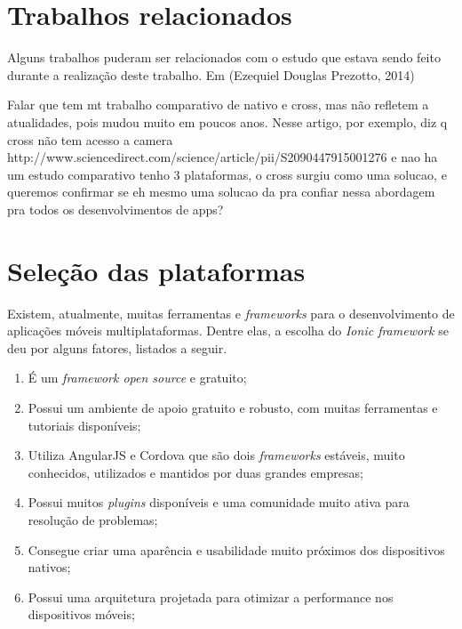 \section{Trabalhos relacionados} \label{sec:trabalhosrelacionados}

Alguns trabalhos puderam ser relacionados com o estudo que estava sendo feito durante a realização deste trabalho.
Em (Ezequiel Douglas Prezotto, 2014)

\begin{env}
Falar que tem mt trabalho comparativo de nativo e cross, mas não refletem a atualidades, pois mudou muito em poucos anos.
Nesse artigo, por exemplo, diz q cross não tem acesso a camera http://www.sciencedirect.com/science/article/pii/S2090447915001276
e nao ha um estudo comparativo
tenho 3 plataformas, o cross surgiu como uma solucao, e queremos confirmar se eh mesmo uma solucao
da pra confiar nessa abordagem pra todos os desenvolvimentos de apps?    
\end{env}

\section{Seleção das plataformas} \label{sec:selecaodasplataformas}

Existem, atualmente, muitas ferramentas e \textit{frameworks} para o desenvolvimento de aplicações móveis multiplataformas. Dentre elas, a escolha do \textit{Ionic framework} se deu por alguns fatores, listados a seguir. 

\begin{enumerate}
    \item É um \textit{framework open source} e gratuito;
    \item Possui um ambiente de apoio gratuito e robusto, com muitas ferramentas e tutoriais disponíveis;
    \item Utiliza AngularJS e Cordova que são dois \textit{frameworks} estáveis, muito conhecidos, utilizados e mantidos por duas grandes empresas;
    \item Possui muitos \textit{plugins} disponíveis e uma comunidade muito ativa para resolução de problemas; %
    \item Consegue criar uma aparência e usabilidade muito próximos dos dispositivos nativos; %
    \item Possui uma arquitetura projetada para otimizar a performance nos dispositivos móveis; 
\end{enumerate}

